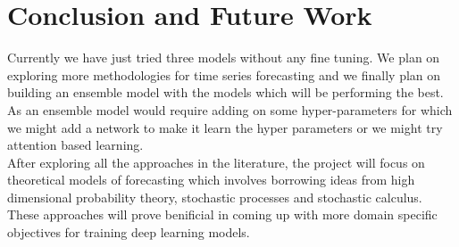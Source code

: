 \documentclass{report}
\newcommand{\mychapter}[2]{
    \setcounter{chapter}{#1}
    \setcounter{section}{0}
    \chapter*{#2}
    \addcontentsline{toc}{chapter}{#2}
}
\begin{document}
\section{Conclusion and Future Work}
Currently we have just tried three models without any fine tuning. We plan on exploring more methodologies for time series forecasting and we finally plan on building an ensemble model with the models which will be performing the best. As an ensemble model would require adding on some hyper-parameters for which we might add a network to make it learn the hyper parameters or we might try attention based learning. \\After exploring all the approaches in the literature, the project will focus on theoretical models of forecasting which involves borrowing ideas from high dimensional probability theory, stochastic processes and stochastic calculus. These approaches will prove benificial in coming up with more domain specific objectives for training deep learning models.


\end{document}
